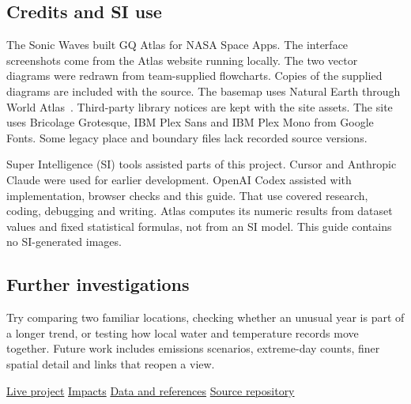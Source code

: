 \documentclass[11pt,letterpaper]{article}
\begin{document}
\subsection*{Credits and SI use}
The Sonic Waves built GQ Atlas for NASA Space Apps. The interface screenshots come from the Atlas website running locally. The two vector diagrams were redrawn from team-supplied flowcharts. Copies of the supplied diagrams are included with the source. The basemap uses Natural Earth through World Atlas~\cite{natural-earth}. Third-party library notices are kept with the site assets. The site uses Bricolage Grotesque, IBM Plex Sans and IBM Plex Mono from Google Fonts. Some legacy place and boundary files lack recorded source versions.

Super Intelligence (SI) tools assisted parts of this project. Cursor and Anthropic Claude were used for earlier development. OpenAI Codex assisted with implementation, browser checks and this guide. That use covered research, coding, debugging and writing. Atlas computes its numeric results from dataset values and fixed statistical formulas, not from an SI model. This guide contains no SI-generated images.
\subsection*{Further investigations}
Try comparing two familiar locations, checking whether an unusual year is part of a longer trend, or testing how local water and temperature records move together. Future work includes emissions scenarios, extreme-day counts, finer spatial detail and links that reopen a view.

\href{https://gqatlas.vercel.app/}{Live project}
\quad\textbullet\quad
\href{https://gqatlas.vercel.app/impacts/}{Impacts}
\quad\textbullet\quad
\href{https://gqatlas.vercel.app/data-and-methods/}{Data and references}
\quad\textbullet\quad
\href{https://github.com/advayc/space-apps}{Source repository}
\end{document}
